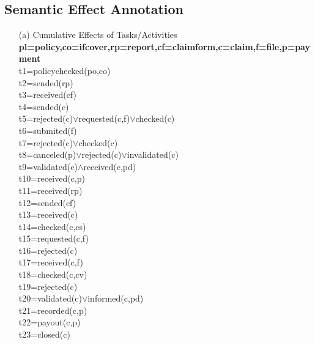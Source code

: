 \documentclass[runningheads]{llncs}
\begin{document}
\subsection{Semantic Effect Annotation}

\begin{itemize}
    \item[(a)]{Cumulative Effects of Tasks/Activities} \\
          \textbf{pl=policy,co=ifcover,rp=report,cf=claimform,c=claim,f=file,p=payment}\\
          t1=policychecked(po,co) \\
          t2=sended(rp)\\
          t3=received(cf)\\
          t4=sended(c)\\
          t5=rejected(c)$\vee$requested(c,f)$\vee$checked(c)\\
          t6=submited(f)\\
          t7=rejected(c)$\vee$checked(c)\\
          t8=canceled(p)$\vee$rejected(c)$\vee$invalidated(c)\\
          t9=validated(c)$\wedge$received(c,pd)\\
          t10=received(c,p)\\
          t11=received(rp)\\
          t12=sended(cf)\\
          t13=received(c)\\
          t14=checked(c,cs)\\
          t15=requested(c,f)\\
          t16=rejected(c)\\
          t17=received(c,f)\\
          t18=checked(c,cv)\\
          t19=rejected(c)\\
          t20=validated(c)$\vee$informed(c,pd)\\
          t21=recorded(c,p)\\
          t22=payout(c,p)\\
          t23=closed(c)\\


\end{itemize}
\end{document}
